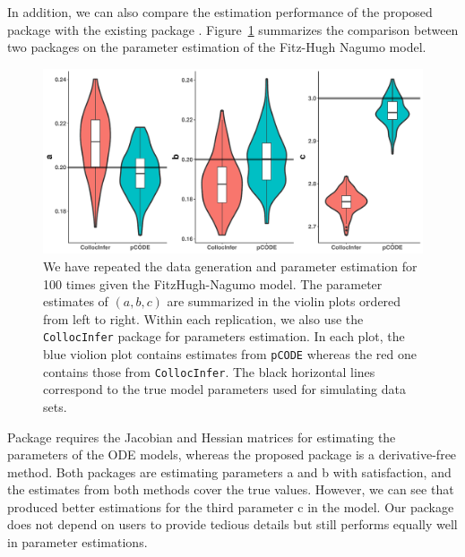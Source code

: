 In addition, we can also compare the estimation performance of the proposed package  with the existing package . Figure~\ref{fig:comparison} summarizes the comparison between two packages on the parameter estimation of the Fitz-Hugh Nagumo model. 

\begin{figure}[H]
  \centering 
  \includegraphics[width=\textwidth]{comparisonbetweentwopackages.pdf}
  \caption{\label{fig:comparison} We have repeated the data generation and parameter estimation for 100 times given the FitzHugh-Nagumo model. The parameter estimates of $(a,b,c)$ are summarized in the violin plots ordered from left to right. Within each replication, we also use the \lstinline{CollocInfer} package for parameters estimation. In each plot, the blue violion plot contains estimates from \lstinline{pCODE} whereas the red one contains those from \lstinline{CollocInfer}. The black horizontal lines correspond to the true model parameters used for simulating data sets.}
\end{figure}

Package  requires the Jacobian and Hessian matrices for estimating the parameters of the ODE models, whereas the proposed  package is a derivative-free method. Both packages are estimating parameters a and b with satisfaction, and the estimates from both methods cover the true values. However, we can see that  produced better estimations for the third parameter c in the model. Our package does not depend on users to provide tedious details but still performs equally well in parameter estimations. 




